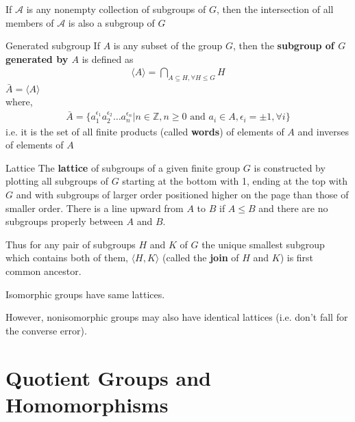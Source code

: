 \documentclass[titlepage, 12pt]{book}
\begin{document}
\begin{proposition}{}{}
    If $\mathcal{A}$ is any nonempty collection of subgroups of $G$, then
        the intersection of all members of $\mathcal{A}$ is also a subgroup of
        $G$
\end{proposition}
\begin{definition}{Generated subgroup}{}
    If $A$ is any subset of the group $G$, then the \textbf{subgroup of
        $G$ generated by $A$} is defined as
        \begin{gather*}
            \langle A\rangle = \bigcap_{A\subseteq H,\forall H\le G}H
        \end{gather*}
    $\bar{A} = \langle A\rangle$\\
        where,
        \begin{gather*}
            \bar{A} = \{a_1^{\epsilon_1}a_2^{\epsilon_2}\dots
                a_n^{\epsilon_n}|n\in\mathbb{Z}, n\ge 0\textrm{ and } a_i\in A,
            \epsilon_i = \pm 1, \forall i\}
        \end{gather*}
        i.e. it is the set of all finite products (called \textbf{words}) of
        elements of $A$ and inverses of elements of $A$
\end{definition}
\begin{definition}{Lattice}{}
    The \textbf{lattice} of subgroups of a given finite group $G$ is constructed
    by plotting all subgroups of $G$ starting at the bottom with 1, ending at
    the top with $G$ and with subgroups of larger order positioned higher on the
    page than those of smaller order. There is a line upward from $A$ to $B$ if
    $A\le B$ and there are no subgroups properly between $A$ and $B$.
\end{definition}
Thus for any pair of subgroups $H$ and $K$ of $G$ the unique smallest subgroup
which contains both of them, $\langle H, K\rangle$ (called the \textbf{join} of
$H$ and $K$) is first common ancestor.
\begin{proposition}{}{}
    Isomorphic groups have same lattices.
\end{proposition}
However, nonisomorphic groups may also have identical lattices (i.e. don't fall
for the converse error).

\chapter{Quotient Groups and Homomorphisms}
\end{document}
